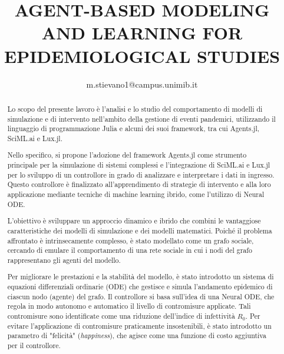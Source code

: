\documentclass{article}
\title{AGENT-BASED MODELING AND LEARNING FOR EPIDEMIOLOGICAL STUDIES}
\author{m.stievano1@campus.unimib.it}
\begin{document}


\begin{abstract}
    Lo scopo del presente lavoro è l'analisi e lo studio del comportamento 
    di modelli di simulazione e di intervento nell'ambito della gestione 
    di eventi pandemici, utilizzando il linguaggio di programmazione Julia 
    e alcuni dei suoi framework, tra cui Agents.jl, SciML.ai e Lux.jl.

    Nello specifico, si propone l'adozione del framework Agents.jl come 
    strumento principale per la simulazione di sistemi complessi e 
    l'integrazione di SciML.ai e Lux.jl per lo sviluppo di un controllore 
    in grado di analizzare e interpretare i dati in ingresso. 
    Questo controllore è finalizzato all'apprendimento di strategie di 
    intervento e alla loro applicazione mediante tecniche di machine 
    learning ibrido, come l'utilizzo di Neural ODE.
    
    L'obiettivo è sviluppare un approccio dinamico e ibrido che combini 
    le vantaggiose caratteristiche dei modelli di simulazione e dei 
    modelli matematici. Poiché il problema affrontato è intrinsecamente 
    complesso, è stato modellato come un grafo sociale, 
    cercando di emulare il comportamento di una rete sociale in cui i 
    nodi del grafo rappresentano gli agenti del modello.
    
    Per migliorare le prestazioni e la stabilità del modello, è stato 
    introdotto un sistema di equazioni differenziali ordinarie (ODE) 
    che gestisce e simula l'andamento epidemico di ciascun nodo (agente) 
    del grafo. Il controllore si basa sull'idea di una Neural ODE, 
    che regola in modo autonomo e automatico il livello di contromisure 
    applicate. Tali contromisure sono identificate come una riduzione 
    dell'indice di infettività $R_0$. Per evitare l'applicazione di 
    contromisure praticamente insostenibili, è stato introdotto un 
    parametro di "felicità" (\emph{happiness}), che agisce come una 
    funzione di costo aggiuntiva per il controllore.
\end{abstract}


\tableofcontents
\newpage
\listoffigures
\newpage








\end{document}

